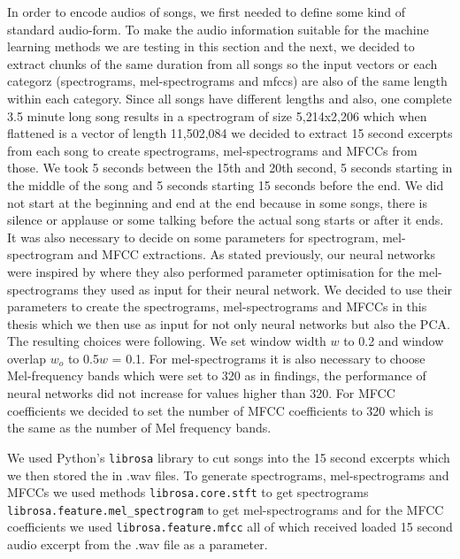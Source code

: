 In order to encode audios of songs, we first needed to define some kind of standard audio-form. To make the audio information suitable for the machine learning methods we are testing in this section and the next, we decided to extract chunks of the same duration from all songs so the input vectors or each categorz (spectrograms, mel-spectrograms and mfccs) are also of the same length within each category. Since all songs have different lengths and also, one complete 3.5 minute long song results in a spectrogram of size 5,214x2,206 which when flattened is a vector of length 11,502,084 we decided to extract 15 second excerpts from each song to create spectrograms, mel-spectrograms and MFCCs from those. We took 5 seconds between the 15th and 20th second, 5 seconds starting in the middle of the song and 5 seconds starting 15 seconds before the end. We did not start at the beginning and end at the end because in some songs, there is silence or applause or some talking before the actual song starts or after it ends. \\

It was also necessary to decide on some parameters for spectrogram, mel-spectrogram and MFCC extractions. As stated previously, our neural networks were inspired by \cite{inproceedings_RNNs} where they also performed parameter optimisation for the mel-spectrograms they used as input for their neural network. We decided to use their parameters to create the spectrograms, mel-spectrograms and MFCCs in this thesis which we then use as input for not only neural networks but also the PCA. \\
The resulting choices were following. We set window width $w$ to 0.2 and window overlap $w_o$ to 0.5$w$ = 0.1. For mel-spectrograms it is also necessary to choose Mel-frequency bands which were set to 320 as in \cite{inproceedings_RNNs} findings, the performance of neural networks did not increase for values higher than 320. For MFCC coefficients we decided to set the number of MFCC coefficients to 320 which is the same as the number of Mel frequency bands.

We used Python's \texttt{librosa} library \cite{brian_mcfee_2019_2564164} to cut songs into the 15 second excerpts which we then stored the in .wav files. To generate spectrograms, mel-spectrograms and MFCCs we used methods \texttt{librosa.core.stft} to get spectrograms \texttt{librosa.feature.mel\_spectrogram} to get mel-spectrograms and for the MFCC coefficients we used \texttt{librosa.feature.mfcc} all of which received loaded 15 second audio excerpt from the .wav file as a parameter. 

